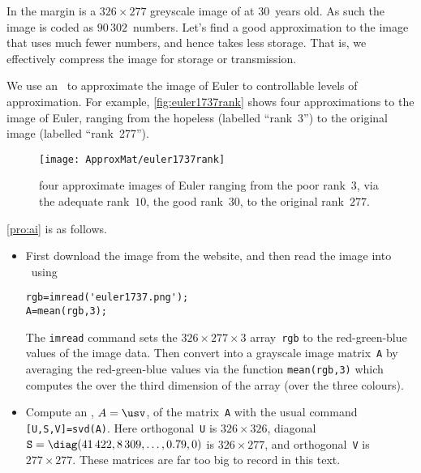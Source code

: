 \begin{example} \label{eg:euler1737}
In the margin is a \(326\times277\) greyscale image of  at 30~years old.  
As such the image is coded as \(90\,302\)~numbers.
Let's find a good approximation to the image that uses much fewer numbers, and hence takes less storage.
That is, we effectively compress the image for storage or transmission.

\begin{solution} 
We use an \svd\ to approximate the image of Euler to controllable levels of approximation.
For example, \autoref{fig:euler1737rank} shows four approximations to the image of Euler, ranging from the hopeless (labelled ``rank~3'')  to the original image (labelled ``rank~277'').
\begin{figure}
\caption{four approximate images of Euler ranging from the poor rank~\(3\), via the adequate rank~\(10\), the good rank~\(30\), to the original rank~\(277\).}
\label{fig:euler1737rank}
\centering
\texttt{[image: ApproxMat/euler1737rank]}
\end{figure}

\autoref{pro:ai} is as follows.
\begin{itemize}
\item First download the image from the website, and then read the image into \script\ using 
\begin{verbatim}
rgb=imread('euler1737.png');
A=mean(rgb,3);
\end{verbatim}
The \verb|imread| command sets the \(326\times277\times3\) array~\verb|rgb| to the red-green-blue values of the image data. 
Then convert into a grayscale image matrix~\verb|A| by averaging the 
red-green-blue values via the function \verb|mean(rgb,3)| which computes the  over the third dimension of the array (over the three colours).

\item Compute an \svd, \(A=\usv\), of the matrix~\verb|A| with the usual command \verb|[U,S,V]=svd(A)|.
Here orthogonal~\verb|U| is \(326\times326\), diagonal \(\verb|S|=\diag(41\,422, 8\,309,  \ldots,0.79,0)\) is \(326\times277\), and orthogonal~\verb|V| is \(277\times277\).
These matrices are far too big to record in this text.
\setbox\ajrqrbox\hbox{}%
\marginpar{\usebox{\ajrqrbox\\[2ex]}}%



\end{itemize}
\end{solution}
\end{example}
